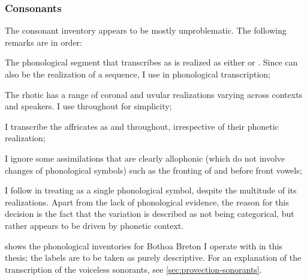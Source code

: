 \subsubsection{Consonants}
\label{sec:bothoa-consonant-dist}

The consonant inventory appears to be mostly unproblematic. The following remarks are in order:

\begin{itemize*}
\item The phonological segment that \citet{humphreys95:_phonol_bothoa_saint_nicol_pelem} transcribes as  is realized as either  or . Since  can also be the realization of a \ipa{[ni]} sequence, I use \ipa{[j̃\kern-1pt]} in phonological transcription;
\item The rhotic has a range of coronal and uvular realizations varying across contexts and speakers. I use \ipa{[r]} throughout for simplicity;
\item I transcribe the affricates as \ipa{[ʧ]} and \ipa{[dʒ]} throughout, irrespective of their phonetic realization;
\item I ignore some assimilations that are clearly allophonic (\ie which do not involve changes of phonological symbols) such as the fronting of \ipa{[k]} and \ipa{[ɡ]} before front vowels;
\item I follow \citet{humphreys95:_phonol_bothoa_saint_nicol_pelem} in treating \ipa{[h]} as a single phonological symbol, despite the multitude of its realizations. Apart from the lack of phonological evidence, the reason for this decision is the fact that the variation is described as not being categorical, but rather appears to be driven by phonetic context.
\end{itemize*}

 shows the phonological inventories for Bothoa Breton I operate with in this thesis; the labels are to be taken as purely descriptive. For an explanation of the transcription of the voiceless sonorants, see \cref{sec:provection-sonorants}.


